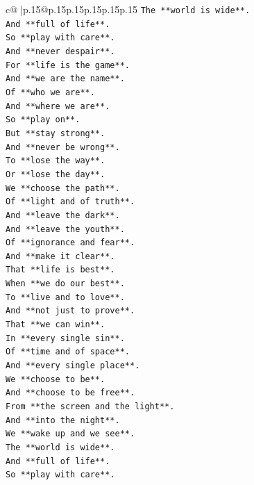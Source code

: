 \documentclass{article}
\begin{document}
{\begin{supertabular}{c@{$\;$}|p{.15\linewidth}@{}p{.15\linewidth}p{.15\linewidth}p{.15\linewidth}p{.15\linewidth}p{.15\linewidth}}
{{{\texttt{The **world is wide**.} \\
\texttt{And **full of life**.} \\
\texttt{So **play with care**.} \\
\texttt{And **never despair**.} \\
\texttt{For **life is the game**.} \\
\texttt{And **we are the name**.} \\
\texttt{Of **who we are**.} \\
\texttt{And **where we are**.} \\
\texttt{So **play on**.} \\
\texttt{But **stay strong**.} \\
\texttt{And **never be wrong**.} \\
\texttt{To **lose the way**.} \\
\texttt{Or **lose the day**.} \\
\texttt{We **choose the path**.} \\
\texttt{Of **light and of truth**.} \\
\texttt{And **leave the dark**.} \\
\texttt{And **leave the youth**.} \\
\texttt{Of **ignorance and fear**.} \\
\texttt{And **make it clear**.} \\
\texttt{That **life is best**.} \\
\texttt{When **we do our best**.} \\
\texttt{To **live and to love**.} \\
\texttt{And **not just to prove**.} \\
\texttt{That **we can win**.} \\
\texttt{In **every single sin**.} \\
\texttt{Of **time and of space**.} \\
\texttt{And **every single place**.} \\
\texttt{We **choose to be**.} \\
\texttt{And **choose to be free**.} \\
\texttt{From **the screen and the light**.} \\
\texttt{And **into the night**.} \\
\texttt{We **wake up and we see**.} \\
\texttt{The **world is wide**.} \\
\texttt{And **full of life**.} \\
\texttt{So **play with care**.} \\
}}}
\end{supertabular}}
\end{document}
